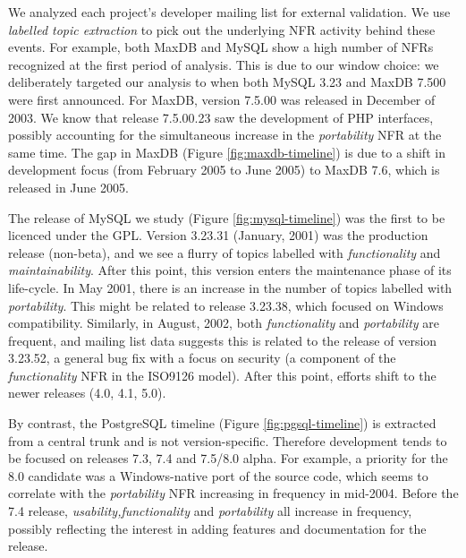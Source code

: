 \documentclass[smallextended]{svjour3}       %
\begin{document}

We analyzed each project's developer mailing list for external validation. 
We use \textit{labelled topic extraction} to pick out the underlying NFR activity behind these events. 
For example, both MaxDB and MySQL show a high number of NFRs recognized at the first period of analysis. 
This is due to our window choice: we deliberately targeted our
analysis to when both MySQL 3.23
and MaxDB 7.500 were first announced. For MaxDB, version 7.5.00  was released in December of 2003. 
We know that release 7.5.00.23 saw the development of PHP interfaces, possibly accounting for the simultaneous increase in the \emph{portability}
NFR at the same time.
The gap in MaxDB (Figure \ref{fig:maxdb-timeline}) is due to a shift in development focus (from February 2005 to June 2005) to MaxDB 7.6, which is
released in June 2005.

The release of MySQL we study  (Figure \ref{fig:mysql-timeline}) was the first to be licenced under the GPL. 
Version 3.23.31 (January, 2001) was the production release (non-beta), and we see a flurry of topics labelled with \emph{functionality} and
\emph{maintainability}. 
After this point, this version enters the maintenance phase of its life-cycle. 
In May 2001, there is an increase in the number of topics labelled with \emph{portability}. 
This might be related to release 3.23.38, which focused on Windows compatibility. 
Similarly, in August, 2002, both \emph{functionality} and \emph{portability} are frequent, and mailing list data suggests this is related to the release
of version 3.23.52, a general bug fix with a focus on security (a component of the \emph{functionality} NFR in the ISO9126 model). 
After this point, efforts shift to the newer releases (4.0, 4.1,
5.0). 

By contrast, the PostgreSQL timeline  (Figure \ref{fig:pgsql-timeline}) is extracted from a central trunk and is not version-specific. Therefore development 
tends to be focused on releases 7.3, 7.4 and 7.5/8.0 alpha. For example, a priority for the 8.0 candidate was a Windows-native port of the source code, which seems to 
correlate with the \emph{portability} NFR increasing in frequency in mid-2004. Before the 7.4 release, \emph{usability,functionality} and \emph{portability} all 
increase in frequency, possibly reflecting the interest in adding features and documentation for the release.
\end{document}
